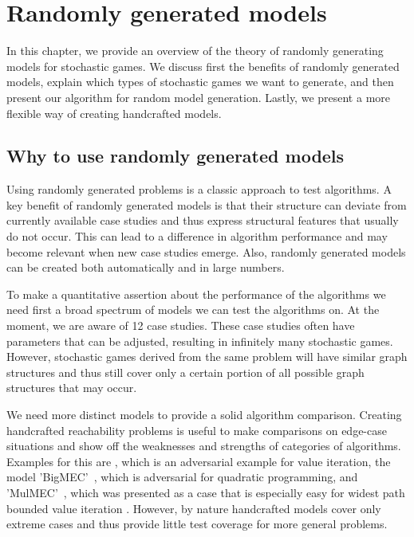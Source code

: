 \chapter{Randomly generated models} \label{ch:randomGen}
In this chapter, we provide an overview of the theory of randomly generating models for stochastic games.
We discuss first the benefits of randomly generated models, explain which types of stochastic games we want to generate, and then present our algorithm for random model generation.
Lastly, we present a more flexible way of creating handcrafted models.

\section{Why to use randomly generated models} \label{sec:WhyRandomGen}
Using randomly generated problems is a classic approach to test algorithms.
A key benefit of randomly generated models is that their structure can deviate from currently available case studies 
and thus express structural features that usually do not occur. 
This can lead to a difference in algorithm performance and may become relevant when new case studies emerge.
Also, randomly generated models can be created both automatically and in large numbers.

To make a quantitative assertion about the performance of the algorithms we need first a broad spectrum of models we can test the algorithms on.
At the moment, we are aware of 12 case studies.
These case studies often have parameters that can be adjusted, resulting in infinitely many stochastic games.
However, stochastic games derived from the same problem will have similar graph structures and thus still cover only a certain portion
of all possible graph structures that may occur.

We need more distinct models to provide a solid algorithm comparison.
Creating handcrafted reachability problems is useful to make comparisons on edge-case situations and 
show off the weaknesses and strengths of categories of algorithms. Examples for this are \cite{haddadmonmege}, which is an adversarial example for
value iteration, the model 'BigMEC'~\cite{gandalf}, which is adversarial for quadratic programming, and 'MulMEC'~\cite{gandalf}, which was presented as
a case that is especially easy for widest path bounded value iteration \cite{widestPath}.
However, by nature handcrafted models cover only extreme cases and thus provide little test coverage for more general problems.


